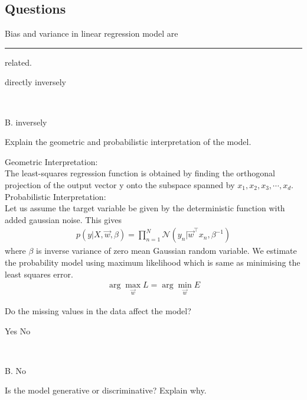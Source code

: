 \documentclass[12pt,letterpaper, onecolumn]{exam}
\begin{document}
\subsection*{Questions}

\begin{questions}
\question[] Bias and variance in linear regression model are \rule{2cm}{0.15mm} related.\\
\begin{oneparchoices}
    \choice directly
    \choice inversely
  \end{oneparchoices} \\
  \begin{Solution}
  B. inversely
  \end{Solution}
  \question[] Explain the geometric and probabilistic interpretation of the model.\\
  \begin{Solution}
  Geometric Interpretation:\\
  The least-squares regression function is obtained by finding the orthogonal projection of the output vector y onto the subspace spanned by ${x_1,x_2,x_3,\cdots,x_d }$.\\
  Probabilistic Interpretation:\\
  Let us assume the target variable be given by the deterministic function with added gaussian noise. This gives
  \begin{align}
  p(y|X, \vec{w}, \beta) = \prod_{n=1}^N \mathcal{N}(y_n|\vec{w}^\top x_n,\beta^{-1})
  \end{align}
  where $\beta$ is inverse variance of zero mean Gaussian random variable. We estimate the probability model using maximum likelihood which is same as minimising the least squares error.
  \begin{align}
  \arg \max_{\vec{w}} L = \arg \min_{\vec{w}} E
  \end{align}
  \end{Solution}
  \question[] Do the missing values in the data affect the model?\\
  \begin{oneparchoices}
    \choice Yes
    \choice No
  \end{oneparchoices} \\
  \begin{Solution}
  B. No
  \end{Solution}
  \question[] Is the model generative or discriminative? Explain why.
  \\
  \begin{Solution}

\end{Solution}
\end{questions}
\end{document}
